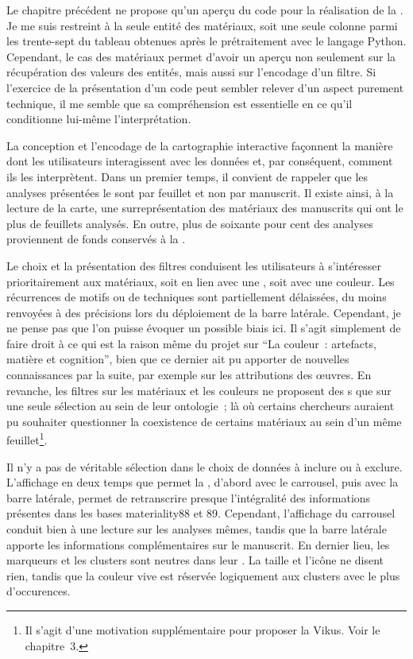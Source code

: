 Le chapitre précédent ne propose qu’un aperçu du code pour la réalisation de la . Je me suis restreint à la seule entité des matériaux, soit une seule colonne parmi les trente-sept du tableau obtenues après le prétraitement avec le langage Python. Cependant, le cas des matériaux permet d’avoir un aperçu non seulement sur la récupération des valeurs des entités, mais aussi sur l’encodage d’un filtre. Si l’exercice de la présentation d’un code peut sembler relever d’un aspect purement technique, il me semble que sa compréhension est essentielle en ce qu’il conditionne lui-même l’interprétation.\par
La conception et l’encodage de la cartographie interactive façonnent la manière dont les utilisateurs interagissent avec les données et, par conséquent, comment ils les interprètent. Dans un premier temps, il convient de rappeler que les analyses présentées le sont par feuillet et non par manuscrit. Il existe ainsi, à la lecture de la carte, une surreprésentation des matériaux des manuscrits qui ont le plus de feuillets analysés. En outre, plus de soixante pour cent des analyses proviennent de fonds conservés à la . \par
Le choix et la présentation des filtres conduisent les utilisateurs à s’intéresser prioritairement aux matériaux, soit en lien avec une , soit avec une couleur. Les récurrences de motifs ou de techniques sont partiellement délaissées, du moins renvoyées à des précisions lors du déploiement de la barre latérale. Cependant, je ne pense pas que l’on puisse évoquer un possible biais ici. Il s’agit simplement de faire droit à ce qui est la raison même du projet sur \enquote{La couleur~: artefacts, matière et cognition}, bien que ce dernier ait pu apporter de nouvelles connaissances par la suite, par exemple sur les attributions des œuvres. En revanche, les filtres sur les matériaux et les couleurs ne proposent des s que sur une seule sélection au sein de leur ontologie ; là où certains chercheurs auraient pu souhaiter questionner la coexistence de certains matériaux au sein d’un même feuillet\footnote{Il s’agit d’une motivation supplémentaire pour proposer la  Vikus. Voir le chapitre~3.}.\par
Il n’y a pas de véritable sélection dans le choix de données à inclure ou à exclure. L’affichage en deux temps que permet la , d’abord avec le carrousel, puis avec la barre latérale, permet de retranscrire presque l’intégralité des informations présentes dans les bases materiality88 et 89. Cependant, l’affichage du carrousel conduit bien à une lecture sur les analyses mêmes, tandis que la barre latérale apporte les informations complémentaires sur le manuscrit. En dernier lieu, les marqueurs et les clusters sont neutres dans leur . La taille et l’icône ne disent rien, tandis que la couleur vive est réservée logiquement aux clusters avec le plus d’occurences.\newpage

